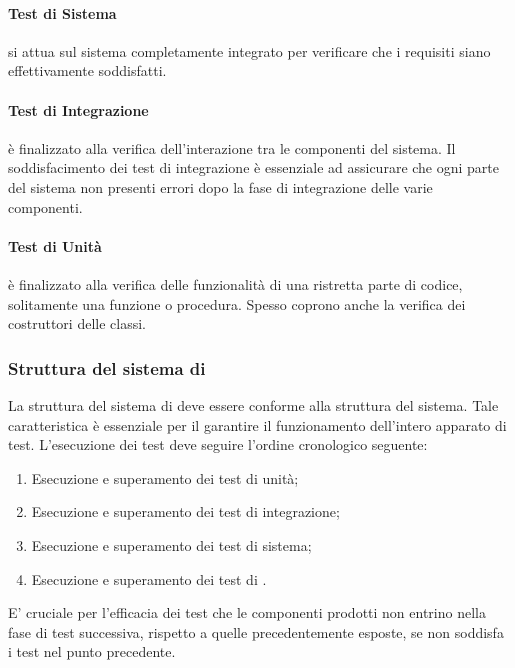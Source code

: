 \documentclass[12pt,a4paper]{article}
\begin{document}
	\paragraph{Test di Sistema} si attua sul sistema completamente integrato per verificare che i requisiti siano effettivamente soddisfatti.
	\paragraph{Test di Integrazione} è finalizzato alla verifica dell'interazione tra le componenti del sistema. Il soddisfacimento dei test di integrazione è essenziale ad assicurare che ogni parte del sistema non presenti errori dopo la fase di integrazione delle varie componenti.
	\paragraph{Test di Unità} è finalizzato alla verifica delle funzionalità di una ristretta parte di codice, solitamente una funzione o procedura. Spesso coprono anche la verifica dei costruttori delle classi.
\subsubsection{Struttura del sistema di }
La struttura del sistema di  deve essere conforme alla struttura del sistema. Tale caratteristica è essenziale per il garantire il funzionamento dell'intero apparato di test. L'esecuzione dei test deve seguire l'ordine cronologico seguente:
\begin{enumerate}
	\item Esecuzione e superamento dei test di unità;
	\item Esecuzione e superamento dei test di integrazione;
	\item Esecuzione e superamento dei test di sistema;
	\item Esecuzione e superamento dei test di  .
\end{enumerate}
E' cruciale per l'efficacia dei test che le componenti prodotti non entrino nella fase di test successiva, rispetto a quelle precedentemente esposte, se non soddisfa i test nel punto precedente.
\end{document}

